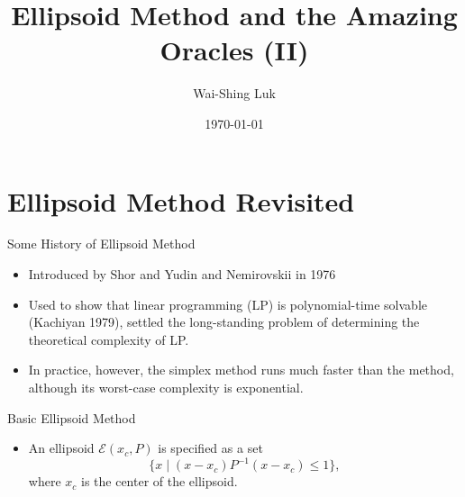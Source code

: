 \documentclass[
  ignorenonframetext,
  aspectratio=169,
  serif,onlymath]{beamer}
\title{Ellipsoid Method and the Amazing Oracles (II)}
\author{Wai-Shing Luk}
\date{\today}
\institute{Fudan University}
\providecommand{\tightlist}{%
  \setlength{\itemsep}{0pt}\setlength{\parskip}{0pt}}
\begin{document}
\frame{\titlepage}

\begin{frame}
  \tableofcontents[hideallsubsections]
\end{frame}
\hypertarget{ellipsoid-method-revisited}{%
\section{Ellipsoid Method Revisited}\label{ellipsoid-method-revisited}}

\begin{frame}{Some History of Ellipsoid Method \citep{BGT81}}
\protect\hypertarget{some-history-of-ellipsoid-method-bgt81}{}

\begin{itemize}
\item
  Introduced by Shor and Yudin and Nemirovskii in 1976
\item
  Used to show that linear programming (LP) is polynomial-time solvable
  (Kachiyan 1979), settled the long-standing problem of determining the
  theoretical complexity of LP.
\item
  In practice, however, the simplex method runs much faster than the
  method, although its worst-case complexity is exponential.
\end{itemize}

\end{frame}

\begin{frame}{Basic Ellipsoid Method}
\protect\hypertarget{basic-ellipsoid-method}{}

\begin{itemize}
\tightlist
\item
  An ellipsoid \(\mathcal{E}(x_c, P)\) is specified as a set
  \[\{x \mid (x-x_c)P^{-1}(x-x_c) \leq 1 \},\] where \(x_c\) is the
  center of the ellipsoid.
\end{itemize}

\begin{figure}
\end{figure}

\end{frame}
\end{document}
